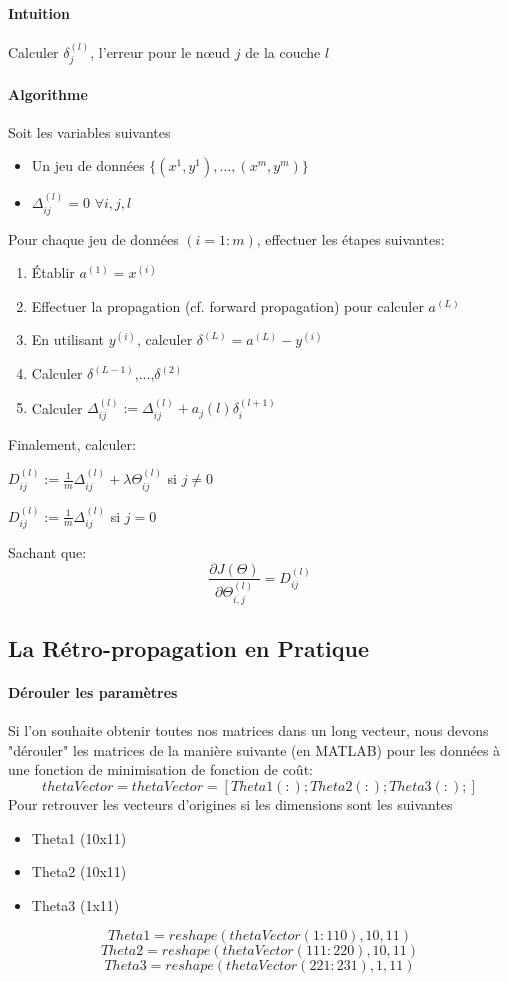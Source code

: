 \documentclass{article}
\theoremstyle{definition}
\begin{document}
\paragraph{Intuition}
Calculer $\delta_j^{(l)}$, l'erreur pour le nœud $j$ de la couche $l$
\paragraph{Algorithme}
Soit les variables suivantes
\begin{itemize}
\item Un jeu de données $\{(x^{1},y^{1}),...,(x^{m},y^{m})\}$
\item $\Delta_{ij}^{(l)} = 0 $ $\forall i,j,l$
\end{itemize}
\par Pour chaque jeu de données $(i=1:m)$, effectuer les étapes suivantes:
\begin{enumerate}
\item Établir $a^{(1)} = x^{(i)}$
\item Effectuer la propagation (cf. forward propagation) pour calculer $a^{(L)}$
\item En utilisant $y^{(i)}$, calculer $\delta^{(L)} = a^{(L)} - y^{(i)}$
\item Calculer $\delta^{(L-1)}$,...,$\delta^{(2)}$
\item Calculer $\Delta_{ij}^{(l)} := \Delta_{ij}^{(l)} + a_j{(l)}\delta_i^{(l+1)}$
\end{enumerate}
\par Finalement, calculer:
\begin{center}
$D_{ij}^{(l)} := \frac{1}{m} \Delta_{ij}^{(l)} + \lambda \Theta_{ij}^{(l)}$ si $j \neq 0$
\end{center}
\begin{center}
$D_{ij}^{(l)} := \frac{1}{m} \Delta_{ij}^{(l)}$ si $j = 0$
\end{center}
\par Sachant que:
$$\frac{\partial J(\Theta)}{\partial \Theta_{i,j}^{(l)}} = D_{ij}^{(l)}$$
\subsection{La Rétro-propagation en Pratique}
\paragraph{Dérouler les paramètres}
Si l'on souhaite obtenir toutes nos matrices dans un long vecteur, nous devons "dérouler" les matrices de la manière suivante (en MATLAB) pour les données à une fonction de minimisation de fonction de coût:
$$thetaVector = thetaVector = [ Theta1(:); Theta2(:); Theta3(:); ]$$
Pour retrouver les vecteurs d'origines si les dimensions sont les suivantes
\begin{itemize}
\item Theta1 (10x11)
\item Theta2 (10x11)
\item Theta3 (1x11)
\end{itemize}
$$Theta1 = reshape(thetaVector(1:110),10,11)$$
$$Theta2 = reshape(thetaVector(111:220),10,11)$$
$$Theta3 = reshape(thetaVector(221:231),1,11)$$
\end{document}
